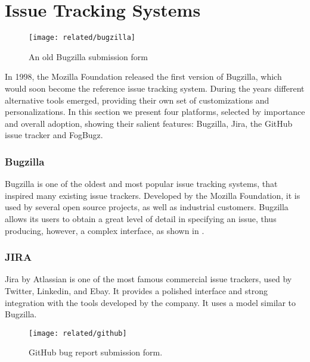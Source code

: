 \section{Issue Tracking Systems}\label{sec:related-bugtrackers}

\begin{figure}[t]
\centering
  \texttt{[image: related/bugzilla]}
  \caption{An old Bugzilla submission form}
  \label{fig:bugzilla-interface}
\end{figure}

In 1998, the Mozilla Foundation released the first version of Bugzilla, which would soon become the reference issue tracking system.
During the years different alternative tools emerged, providing their own set of customizations and personalizations.
In this section we present four platforms, selected by importance and overall adoption, showing their salient features: Bugzilla, Jira, the GitHub issue tracker and FogBugz.


\subsubsection{Bugzilla}
Bugzilla is one of the oldest and most popular issue tracking systems, that inspired many existing issue trackers. Developed by the Mozilla Foundation, it is used by several open source projects, as well as industrial customers. Bugzilla allows its users to obtain a great level of detail in specifying an issue, thus producing, however, a complex interface, as shown in .


\subsubsection{JIRA}
Jira by Atlassian is one of the most famous commercial issue trackers, used by Twitter, Linkedin, and Ebay. It provides a polished interface and strong integration with the tools developed by the company. It uses a model similar to Bugzilla.

\begin{figure}[t]
\centering
 \texttt{[image: related/github]}
 \caption{GitHub bug report submission form.}
 \label{fig:github-interface}
\end{figure}


